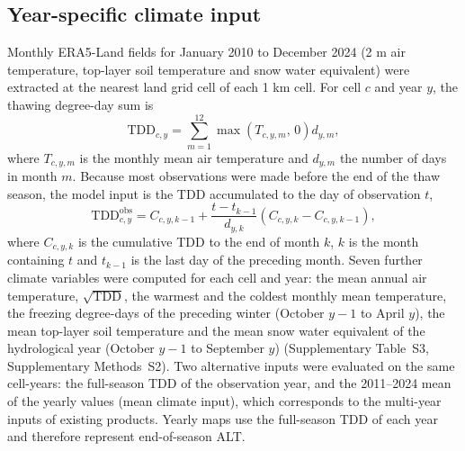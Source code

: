 \subsection{Year-specific climate input}
Monthly ERA5-Land fields for January 2010 to December 2024\cite{munozsabater2021_era5_land} (2 m air temperature, top-layer soil temperature and snow water equivalent) were extracted at the nearest land grid cell of each 1 km cell. For cell $c$ and year $y$, the thawing degree-day sum is
\begin{equation}
\mathrm{TDD}_{c,y} = \sum_{m=1}^{12} \max\!\left(T_{c,y,m},\,0\right) d_{y,m},
\label{eq:tdd}
\end{equation}
where $T_{c,y,m}$ is the monthly mean air temperature and $d_{y,m}$ the number of days in month $m$. Because most observations were made before the end of the thaw season, the model input is the TDD accumulated to the day of observation $t$,
\begin{equation}
\mathrm{TDD}^{\mathrm{obs}}_{c,y} = C_{c,y,k-1} + \frac{t - t_{k-1}}{d_{y,k}} \left( C_{c,y,k} - C_{c,y,k-1} \right),
\label{eq:tddobs}
\end{equation}
where $C_{c,y,k}$ is the cumulative TDD to the end of month $k$, $k$ is the month containing $t$ and $t_{k-1}$ is the last day of the preceding month. Seven further climate variables were computed for each cell and year: the mean annual air temperature, $\sqrt{\mathrm{TDD}}$, the warmest and the coldest monthly mean temperature, the freezing degree-days of the preceding winter (October $y-1$ to April $y$), the mean top-layer soil temperature and the mean snow water equivalent of the hydrological year (October $y-1$ to September $y$) (Supplementary Table~S3, Supplementary Methods~S2). Two alternative inputs were evaluated on the same cell-years: the full-season TDD of the observation year, and the 2011--2024 mean of the yearly values (mean climate input), which corresponds to the multi-year inputs of existing products. Yearly maps use the full-season TDD of each year and therefore represent end-of-season ALT.


